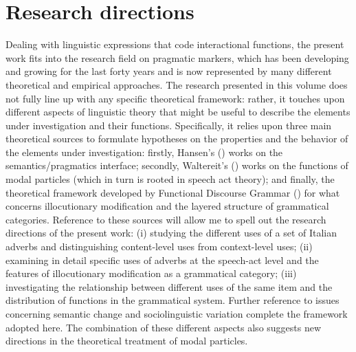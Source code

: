 \section{Research directions}
\hypertarget{Toc124860608}{}
Dealing with linguistic expressions that code interactional functions, the present work fits into the research field on pragmatic markers, which has been developing and growing for the last forty years and is now represented by many different theoretical and empirical approaches. The research presented in this volume does not fully line up with any specific theoretical framework: rather, it touches upon different aspects of linguistic theory that might be useful to describe the elements under investigation and their functions. Specifically, it relies upon three main theoretical sources to formulate hypotheses on the properties and the behavior of the elements under investigation: firstly, Hansen’s (\citeyear*{Hansen2008,Hansen2012}) works on the semantics/pragmatics interface; secondly, Waltereit’s (\citeyear*{Waltereit2001,Waltereit2006}) works on the functions of modal particles (which in turn is rooted in speech act theory); and finally, the theoretical framework developed by Functional Discourse Grammar (\citealt{HengeveldMackenzie2008}) for what concerns illocutionary modification and the layered structure of grammatical categories. Reference to these sources will allow me to spell out the research directions of the present work: 
(i) studying the different uses of a set of Italian adverbs and distinguishing content-level uses from context-level uses; 
(ii) examining in detail specific uses of adverbs at the speech-act level and the features of illocutionary modification as a grammatical category; 
(iii) investigating the relationship between different uses of the same item and the distribution of functions in the grammatical system. Further reference to issues concerning semantic change and sociolinguistic variation complete the framework adopted here. The combination of these different aspects also suggests new directions in the theoretical treatment of modal particles.

